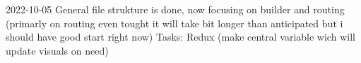 2022-10-05 General file strukture is done, now focusing on builder and routing (primarly on routing even tought it will take bit longer than anticipated but i should have good start right now)
Tasks: 
    Redux (make central variable wich will update visuals on need)
